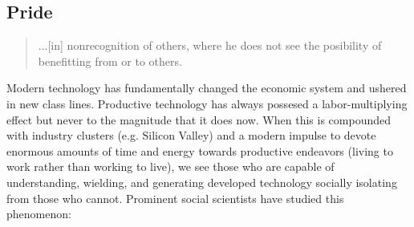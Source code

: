 \documentclass[letterpaper]{article}
\begin{document}




\subsection{Pride}
\begin{quote}
  ...[in] nonrecognition of others, where he does not see the posibility of benefitting from or to others.
\end{quote}

Modern technology has fundamentally changed the economic system and ushered in new class lines. Productive technology has always possesed a labor-multiplying effect but never to the magnitude that it does now. When this is compounded with industry clusters (e.g. Silicon Valley) and a modern impulse to devote enormous amounts of time and energy towards productive endeavors (living to work rather than working to live), we see those who are capable of understanding, wielding, and generating developed technology socially isolating from those who cannot. Prominent social scientists have studied this phenomenon:
\end{document}
